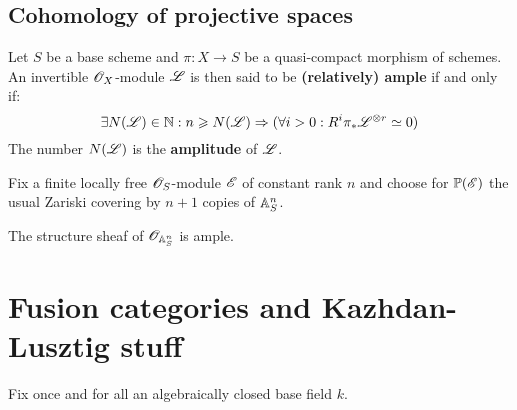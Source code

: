         \subsection{Cohomology of projective spaces}
            \begin{definition} \label{def: ample_invertible_modules}
                Let $S$ be a base scheme and $\pi: X \to S$ be a quasi-compact morphism of schemes. An invertible $\mathscr{O}_X$-module $\mathscr{L}$ is then said to be \textbf{(relatively) ample} if and only if:
                    $$\exists N(\scrL) \in \N: n \geq N(\scrL) \implies ( \forall i > 0: R^i\pi_*\scrL^{\tensor r} \cong 0 )$$
                The number $N(\mathscr{L})$ is the \textbf{amplitude} of $\mathscr{L}$.
            \end{definition}
        
            Fix a finite locally free $\mathscr{O}_S$-module $\mathscr{E}$ of constant rank $n$ and choose for $\mathbb{P}(\mathscr{E})$ the usual Zariski covering by $n + 1$ copies of $\mathbb{A}^n_S$. 
            \begin{lemma}
                The structure sheaf of $\mathscr{O}_{\mathbb{A}^n_S}$ is ample. 
            \end{lemma}


    \section{Fusion categories and Kazhdan-Lusztig stuff}
        \begin{convention}
            Fix once and for all an algebraically closed base field $k$.
        \end{convention}
    
